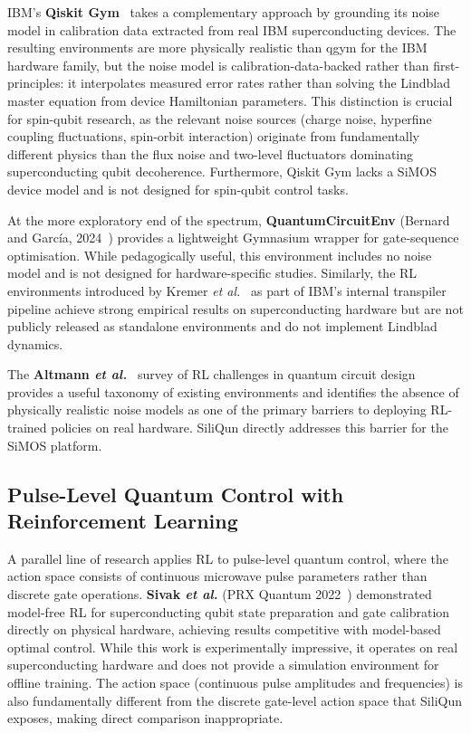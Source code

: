 IBM's \textbf{Qiskit Gym}~\cite{QiskitGym2024} takes a complementary
approach by grounding its noise model in calibration data extracted from
real IBM superconducting devices. The resulting environments are more
physically realistic than qgym for the IBM hardware family, but the noise
model is calibration-data-backed rather than first-principles: it
interpolates measured error rates rather than solving the Lindblad master
equation from device Hamiltonian parameters. This distinction is crucial for spin-qubit research, as the relevant noise
sources (charge noise, hyperfine coupling fluctuations, spin-orbit
interaction) originate from fundamentally different physics than the flux
noise and two-level fluctuators dominating superconducting qubit
decoherence. Furthermore, Qiskit Gym lacks a SiMOS device model and is not
designed for spin-qubit control tasks.

At the more exploratory end of the spectrum, \textbf{QuantumCircuitEnv}
(Bernard and García, 2024~\cite{Bernard2024QuantumCircuitEnv}) provides a
lightweight Gymnasium wrapper for gate-sequence optimisation. While
pedagogically useful, this environment includes no noise model and is not
designed for hardware-specific studies. Similarly, the RL environments
introduced by Kremer \emph{et al.}~\cite{Kremer2024} as part of IBM's
internal transpiler pipeline achieve strong empirical results on
superconducting hardware but are not publicly released as standalone
environments and do not implement Lindblad dynamics.

The \textbf{Altmann \emph{et al.}}~\cite{Altmann2024challenges} survey of
RL challenges in quantum circuit design provides a useful taxonomy of
existing environments and identifies the absence of physically realistic
noise models as one of the primary barriers to deploying RL-trained policies
on real hardware. SiliQun directly addresses this barrier for the SiMOS
platform.

\subsection{Pulse-Level Quantum Control with Reinforcement Learning}
\label{sec:rw_pulse}

A parallel line of research applies RL to pulse-level quantum control,
where the action space consists of continuous microwave pulse parameters
rather than discrete gate operations. \textbf{Sivak \emph{et al.}}
(PRX Quantum 2022~\cite{Sivak2022}) demonstrated model-free RL for
superconducting qubit state preparation and gate calibration directly on
physical hardware, achieving results competitive with model-based optimal
control. While this work is experimentally impressive, it operates on real
superconducting hardware and does not provide a simulation environment for
offline training. The action space (continuous pulse amplitudes and
frequencies) is also fundamentally different from the discrete gate-level
action space that SiliQun exposes, making direct comparison inappropriate.

